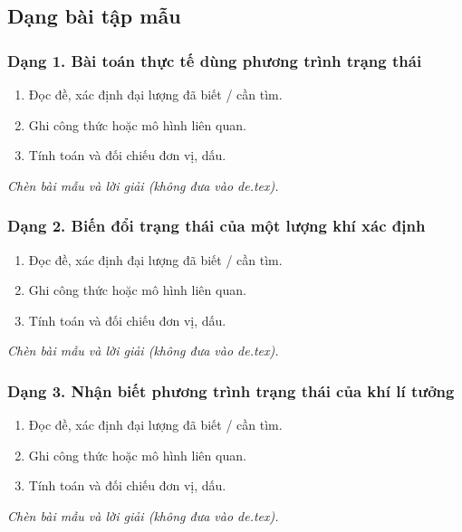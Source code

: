 

\subsection{Dạng bài tập mẫu}
\subsubsection{Dạng 1. Bài toán thực tế dùng phương trình trạng thái}
\begin{phuongphap}
\begin{enumerate}
\item Đọc đề, xác định đại lượng đã biết / cần tìm.
\item Ghi công thức hoặc mô hình liên quan.
\item Tính toán và đối chiếu đơn vị, dấu.
\end{enumerate}
\end{phuongphap}
\begin{vidumau}
\textit{Chèn bài mẫu và lời giải (không đưa vào de.tex).}
\end{vidumau}

\subsubsection{Dạng 2. Biến đổi trạng thái của một lượng khí xác định}
\begin{phuongphap}
\begin{enumerate}
\item Đọc đề, xác định đại lượng đã biết / cần tìm.
\item Ghi công thức hoặc mô hình liên quan.
\item Tính toán và đối chiếu đơn vị, dấu.
\end{enumerate}
\end{phuongphap}
\begin{vidumau}
\textit{Chèn bài mẫu và lời giải (không đưa vào de.tex).}
\end{vidumau}

\subsubsection{Dạng 3. Nhận biết phương trình trạng thái của khí lí tưởng}
\begin{phuongphap}
\begin{enumerate}
\item Đọc đề, xác định đại lượng đã biết / cần tìm.
\item Ghi công thức hoặc mô hình liên quan.
\item Tính toán và đối chiếu đơn vị, dấu.
\end{enumerate}
\end{phuongphap}
\begin{vidumau}
\textit{Chèn bài mẫu và lời giải (không đưa vào de.tex).}
\end{vidumau}

